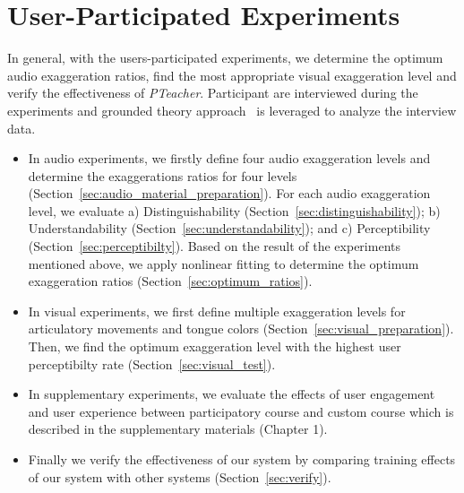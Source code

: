 \documentclass[sigconf]{acmart}
\begin{document}
\section{User-Participated Experiments}
In general, with the users-participated experiments, we determine the optimum audio exaggeration ratios, find the most appropriate visual exaggeration level and verify the effectiveness of \textit{PTeacher}. Participant are interviewed during the experiments and grounded theory approach~\cite{corbin2014basics} is leveraged to analyze the interview data. 
\begin{itemize}
    \item In audio experiments, we firstly define four audio exaggeration levels and determine the exaggerations ratios for four levels (Section~\ref{sec:audio_material_preparation}). 
    For each audio exaggeration level, we evaluate a) Distinguishability (Section~\ref{sec:distinguishability}); b) Understandability (Section~\ref{sec:understandability}); and c) Perceptibility (Section~\ref{sec:perceptibilty}). 
    Based on the result of the experiments mentioned above, we apply nonlinear fitting to determine the optimum exaggeration ratios (Section~\ref{sec:optimum_ratios}).
    \item In visual experiments, we first define multiple exaggeration levels for articulatory movements and tongue colors (Section~\ref{sec:visual_preparation}). 
    Then, we find the optimum exaggeration level with the highest user perceptibilty rate (Section~\ref{sec:visual_test}). 
    \item In supplementary experiments, we evaluate the effects of user engagement and user experience between participatory course and custom course which is described in the supplementary materials (Chapter 1).
    \item Finally we verify the effectiveness of our system by comparing training effects of our system with other systems (Section~\ref{sec:verify}).  
\end{itemize}
\end{document}
